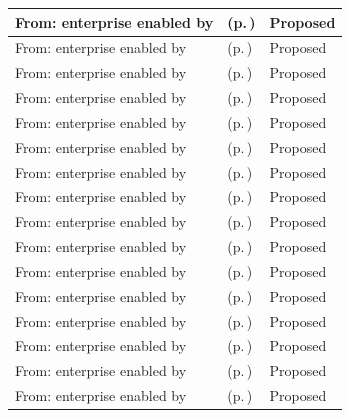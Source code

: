 \begin{longtable}{|>{\raggedright\arraybackslash}p{0.27\TableWidth}|>{\raggedright\arraybackslash}p{0.48\TableWidth}|>{\raggedright\arraybackslash}p{0.25\TableWidth}|}
From: enterprise enabled by & \nameref{cap:bec-primary-care} (p.\,\pageref{cap:bec-primary-care}) & Proposed\\\hline
From: enterprise enabled by & \nameref{cap:bec-acute-care} (p.\,\pageref{cap:bec-acute-care}) & Proposed\\\hline
From: enterprise enabled by & \nameref{cap:bec-emergency-care} (p.\,\pageref{cap:bec-emergency-care}) & Proposed\\\hline
From: enterprise enabled by & \nameref{cap:bec-inpatient-care} (p.\,\pageref{cap:bec-inpatient-care}) & Proposed\\\hline
From: enterprise enabled by & \nameref{cap:bec-community-care} (p.\,\pageref{cap:bec-community-care}) & Proposed\\\hline
From: enterprise enabled by & \nameref{cap:bec-outreach-care} (p.\,\pageref{cap:bec-outreach-care}) & Proposed\\\hline
From: enterprise enabled by & \nameref{cap:bec-remote-virtual-care} (p.\,\pageref{cap:bec-remote-virtual-care}) & Proposed\\\hline
From: enterprise enabled by & \nameref{cap:bec-preventive-care} (p.\,\pageref{cap:bec-preventive-care}) & Proposed\\\hline
From: enterprise enabled by & \nameref{cap:bec-diagnostic-services} (p.\,\pageref{cap:bec-diagnostic-services}) & Proposed\\\hline
From: enterprise enabled by & \nameref{cap:bec-medication-therapy} (p.\,\pageref{cap:bec-medication-therapy}) & Proposed\\\hline
From: enterprise enabled by & \nameref{cap:bec-clinic-practice-operations} (p.\,\pageref{cap:bec-clinic-practice-operations}) & Proposed\\\hline
From: enterprise enabled by & \nameref{cap:bec-ward-operations} (p.\,\pageref{cap:bec-ward-operations}) & Proposed\\\hline
From: enterprise enabled by & \nameref{cap:bec-theatre-operations} (p.\,\pageref{cap:bec-theatre-operations}) & Proposed\\\hline
From: enterprise enabled by & \nameref{cap:bec-emergency-department-operations} (p.\,\pageref{cap:bec-emergency-department-operations}) & Proposed\\\hline
From: enterprise enabled by & \nameref{cap:bec-outpatient-operations} (p.\,\pageref{cap:bec-outpatient-operations}) & Proposed\\\hline
From: enterprise enabled by & \nameref{cap:bec-mobile-staff-management} (p.\,\pageref{cap:bec-mobile-staff-management}) & Proposed\\\hline

\end{longtable}
